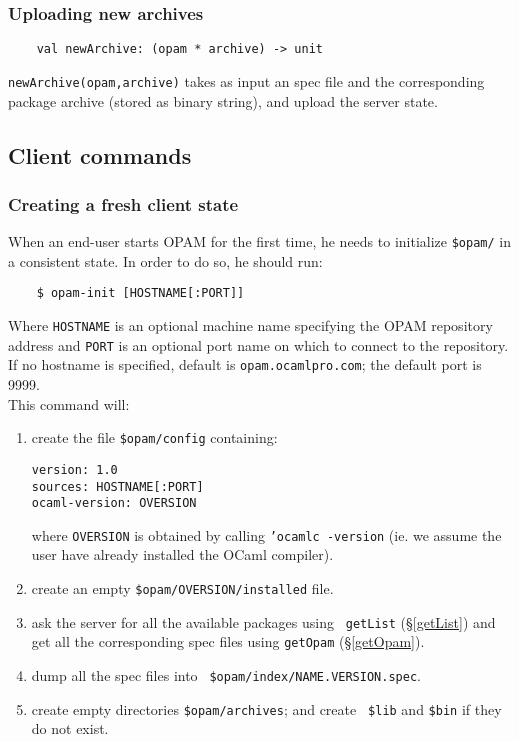\documentclass[a4paper,11pt]{article}
\begin{document}
\subsubsection{Uploading new archives}
\label{newArchive}

\begin{verbatim}
    val newArchive: (opam * archive) -> unit
\end{verbatim}

{\tt newArchive(opam,archive)} takes as input an spec file and the
corresponding package archive (stored as binary string), and upload
the server state.

\subsection{Client commands}

\subsubsection{Creating a fresh client state}

When an end-user starts OPAM for the first time, he needs to
initialize {\tt \$opam/} in a consistent state. In order to do so, he
should run:

\begin{verbatim}
    $ opam-init [HOSTNAME[:PORT]]
\end{verbatim}

Where {\tt HOSTNAME} is an optional machine name specifying the OPAM
repository address and {\tt PORT} is an optional port name on which to
connect to the repository. If no hostname is specified, default is
{\tt opam.ocamlpro.com}; the default port is 9999. \\

This command will:

\begin{enumerate}

\item create the file {\tt \$opam/config} containing:

\begin{verbatim}
version: 1.0
sources: HOSTNAME[:PORT]
ocaml-version: OVERSION
\end{verbatim}

where {\tt OVERSION} is obtained by calling {\tt 'ocamlc -version}
(ie. we assume the user have already installed the OCaml compiler).

\item create an empty {\tt \$opam/OVERSION/installed} file.

\item ask the server for all the available packages using {\tt
  getList} (\S\ref{getList}) and get all the corresponding spec files
  using {\tt getOpam} (\S\ref{getOpam}).

\item dump all the spec files into {\tt
  \$opam/index/NAME.VERSION.spec}.

\item create empty directories {\tt \$opam/archives}; and create {\tt
  \$lib} and {\tt \$bin} if they do not exist.

\end{enumerate}
\end{document}
